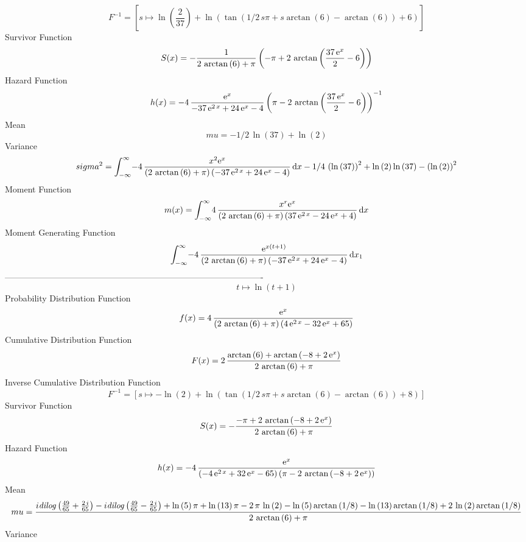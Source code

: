 \documentclass[12pt]{article}
\begin{document}
  $$F^{-1} = [s\mapsto \ln  \left( {\frac{2}{37}} \right) +\ln  \left( \tan \left( 
1/2\,s\pi+s\arctan \left( 6 \right) -\arctan \left( 6 \right) 
 \right) +6 \right) ]
$$Survivor Function 
 $$ S(x)=-{\frac {1}{2\,\arctan \left( 6 \right) +\pi} \left( -\pi+2\,\arctan
 \left( {\frac {37\,{{\rm e}^{x}}}{2}}-6 \right)  \right) }
$$ Hazard Function 
 $$ h(x)=-4\,{\frac {{{\rm e}^{x}}}{-37\,{{\rm e}^{2\,x}}+24\,{{\rm e}^{x}}-4}
 \left( \pi-2\,\arctan \left( {\frac {37\,{{\rm e}^{x}}}{2}}-6
 \right)  \right) ^{-1}}
$$Mean 
 $$ mu=-1/2\,\ln  \left( 37 \right) +\ln  \left( 2 \right) 
$$ Variance 
 $$ sigma^2 = \int_{-\infty }^{\infty }\!-4\,{\frac {{x}^{2}{{\rm e}^{x}}}{ \left( 2
\,\arctan \left( 6 \right) +\pi \right)  \left( -37\,{{\rm e}^{2\,x}}+
24\,{{\rm e}^{x}}-4 \right) }}\,{\rm d}x-1/4\, \left( \ln  \left( 37
 \right)  \right) ^{2}+\ln  \left( 2 \right) \ln  \left( 37 \right) -
 \left( \ln  \left( 2 \right)  \right) ^{2}
$$Moment Function 
 $$ m(x) = \int_{-\infty }^{\infty }\!4\,{\frac {{x}^{r}{{\rm e}^{x}}}{ \left( 2
\,\arctan \left( 6 \right) +\pi \right)  \left( 37\,{{\rm e}^{2\,x}}-
24\,{{\rm e}^{x}}+4 \right) }}\,{\rm d}x
$$ Moment Generating Function 
 $$\int_{-\infty }^{\infty }\!-4\,{\frac {{{\rm e}^{x \left( t+1 \right) 
}}}{ \left( 2\,\arctan \left( 6 \right) +\pi \right)  \left( -37\,{
{\rm e}^{2\,x}}+24\,{{\rm e}^{x}}-4 \right) }}\,{\rm d}x_{{1}}
$$-------------------------------------------------------------------------------------------  \\$$t\mapsto \ln  \left( t+1 \right) 
$$Probability Distribution Function 
$$  f(x)=4\,{\frac {{{\rm e}^{x}}}{ \left( 2\,\arctan \left( 6 \right) +\pi
 \right)  \left( 4\,{{\rm e}^{2\,x}}-32\,{{\rm e}^{x}}+65 \right) }}
$$Cumulative Distribution Function  
 $$F(x)=2\,{\frac {\arctan \left( 6 \right) +\arctan \left( -8+2\,{{\rm e}^{x}
} \right) }{2\,\arctan \left( 6 \right) +\pi}}
$$ Inverse Cumulative Distribution Function 
  $$F^{-1} = [s\mapsto -\ln  \left( 2 \right) +\ln  \left( \tan \left( 1/2\,s\pi+s
\arctan \left( 6 \right) -\arctan \left( 6 \right)  \right) +8
 \right) ]
$$Survivor Function 
 $$ S(x)=-{\frac {-\pi+2\,\arctan \left( -8+2\,{{\rm e}^{x}} \right) }{2\,
\arctan \left( 6 \right) +\pi}}
$$ Hazard Function 
 $$ h(x)=-4\,{\frac {{{\rm e}^{x}}}{ \left( -4\,{{\rm e}^{2\,x}}+32\,{{\rm e}^{
x}}-65 \right)  \left( \pi-2\,\arctan \left( -8+2\,{{\rm e}^{x}}
 \right)  \right) }}
$$Mean 
 $$ mu={\frac {i{\it dilog} \left( {\frac{49}{65}}+{\frac {2\,i}{65}}
 \right) -i{\it dilog} \left( {\frac{49}{65}}-{\frac {2\,i}{65}}
 \right) +\ln  \left( 5 \right) \pi+\ln  \left( 13 \right) \pi-2\,\pi
\,\ln  \left( 2 \right) -\ln  \left( 5 \right) \arctan \left( 1/8
 \right) -\ln  \left( 13 \right) \arctan \left( 1/8 \right) +2\,\ln 
 \left( 2 \right) \arctan \left( 1/8 \right) }{2\,\arctan \left( 6
 \right) +\pi}}
$$ Variance 
\end{document}
